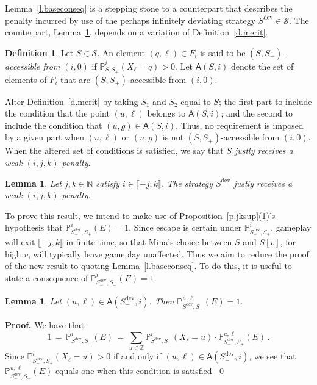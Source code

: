 \documentclass[letterpaper,11pt,oneside,reqno]{amsbook}
\newcommand{\PP}{\ensuremath{\mathbb{P}}}
\newcommand{\N}{\ensuremath{\mathbb{N}}}
\newcommand{\Z}{\ensuremath{\mathbb{Z}}}
\numberwithin{figure}{chapter}
\newtheorem{lemma}[theorem]{Lemma}
\theoremstyle{definition}
\theoremstyle{definition}
\theoremstyle{definition}
\newtheorem{definition}[theorem]{Definition}
\theoremstyle{definition}
\theoremstyle{definition}
\newcommand{\mc}{\mathcal}
\newcommand{\nwithzero}{\N}
\newcommand\pgameplay[3]{\PP^{#3}_{#1,#2}}
\newcommand{\access}{\mathsf{A}}
\newcommand{\sdev}{S_-^{\textrm{dev}}}
\begin{document}
 Lemma~\ref{l.baseconseq} is a stepping stone to a counterpart that describes the penalty incurred by use of the perhaps infinitely deviating strategy $\sdev \in \mc{S}$.
 The counterpart, Lemma~\ref{l.baseconseqtwo}, depends on a variation of Definition~\ref{d.merit}.
\begin{definition}\label{d.just}
Let $S \in \mc{S}$. 
An element $(q,\ell) \in F_i$ is said to be {\em $(S,S_+)$-accessible
from $(i,0)$} 
if $\pgameplay{S}{S_+}{i}(X_\ell = q) > 0$.
Let $\access(S,i)$ denote the set of elements of $F_i$ that are $(S,S_+)$-accessible from $(i,0)$.

Alter Definition~\ref{d.merit} by taking $S_1$ and $S_2$ equal to $S$; the first part to include the condition that the point $(u,\ell)$ belongs to $\access(S,i)$; 
and the second to include the condition that $(u,g) \in \access(S,i)$.
Thus, no requirement is imposed by a given part when 
$(u,\ell)$ or $(u,g)$ is not $(S,S_+)$-accessible from $(i,0)$.
When the altered set of conditions is satisfied, we say that {\em $S$ justly receives a weak $(i,j,k)$-penalty}.
\end{definition}
 \begin{lemma}\label{l.baseconseqtwo}
Let $j,k \in \nwithzero$ satisfy $i \in \llbracket -j,k \rrbracket$. The strategy $\sdev$ justly receives a weak $(i,j,k)$-penalty.
\end{lemma}
 To prove this result, we intend to make use of Proposition~\ref{p.jksup}(1)'s hypothesis  that $\pgameplay{\sdev}{S_+}{i}(E)=1$. Since escape is certain under $\pgameplay{\sdev}{S_+}{i}$, gameplay will exit $\llbracket -j,k \rrbracket$
 in finite time, so that Mina's choice between $S$ and $S[v]$, for high $v$, will typically leave gameplay unaffected. Thus we aim to reduce the proof of the new result to quoting Lemma~\ref{l.baseconseq}.
 To do this, it is useful to state a consequence of   $\pgameplay{\sdev}{S_+}{i}(E)=1$.
\begin{lemma}\label{l.escapepropagate}
Let $(u,\ell) \in \access(\sdev,i)$. Then $\pgameplay{\sdev}{S_+}{u,\ell}(E) = 1$.
\end{lemma}
{\bf Proof.} We have that
$$
 1 \, = \, \pgameplay{\sdev}{S_+}{i}(E) \, = \, \sum_{u \in \Z} \pgameplay{\sdev}{S_+}{i}(X_\ell = u) \cdot \pgameplay{\sdev}{S_+}{u,\ell}(E) \, .
$$
Since  $\pgameplay{\sdev}{S_+}{i}(X_\ell = u) > 0$ if and only if $(u,\ell) \in  \access(\sdev,i)$, we see that $\pgameplay{\sdev}{S_+}{u,\ell}(E)$ equals one when this condition is satisfied. \qed
\end{document}
